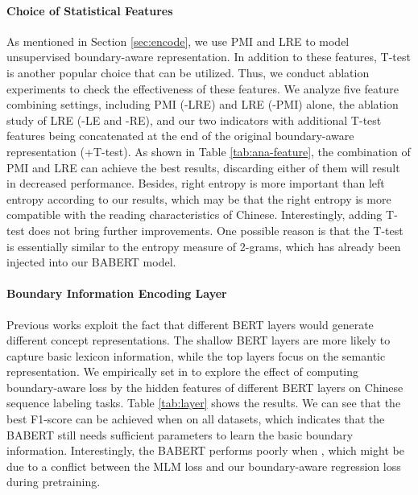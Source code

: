 \documentclass[11pt]{article}
\begin{document}
\begin{CJK}{UTF8}{gbsn}
\paragraph{Choice of Statistical Features}
As mentioned in Section \ref{sec:encode}, we use PMI and LRE to model unsupervised boundary-aware representation.
In addition to these features, T-test \cite{xiao-etal-2021-ernie} is another popular choice that can be utilized.
Thus, we conduct ablation experiments to check the effectiveness of these features.
We analyze five feature combining settings, including PMI (-LRE) and LRE (-PMI) alone, the ablation study of LRE (-LE and -RE), 
and our two indicators with additional T-test features being concatenated at the end of the original boundary-aware representation (+T-test).
As shown in Table \ref{tab:ana-feature}, the combination of PMI and LRE can achieve the best results,
discarding either of them will result in decreased performance.
Besides, right entropy is more important than left entropy according to our results,
which may be that the right entropy is more compatible with the reading characteristics of Chinese.
Interestingly, adding T-test does not bring further improvements.
One possible reason is that the T-test is essentially similar to the entropy measure of 2-grams,
which has already been injected into our BABERT model.


\paragraph{Boundary Information Encoding Layer}
Previous works \cite{jawahar2019does, liu-etal-2021-lexicon} exploit the fact that different BERT layers would generate different concept representations.
The shallow BERT layers are more likely to capture basic lexicon information,
while the top layers focus on the semantic representation.
We empirically set  in  to explore the effect of computing boundary-aware loss by the hidden features  of different BERT layers on Chinese sequence labeling tasks.
Table \ref{tab:layer} shows the results.
We can see that the best F1-score can be achieved when  on all datasets, 
 which indicates that the BABERT still needs sufficient parameters to learn the basic boundary information.
Interestingly, the BABERT performs poorly when ,
which might be due to a conflict between the MLM loss and our boundary-aware regression loss during pretraining.


\end{CJK}
\end{document}
